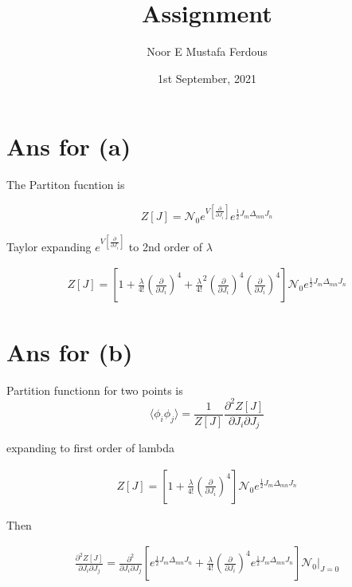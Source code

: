 \documentclass[12pt, letterpaper]{article}
\author{Noor E Mustafa Ferdous}
\title{Assignment}
\date{1st September, 2021}
\newcommand*{\1}{\hspace{1pt}}
\begin{document}
    \maketitle
    
    \section*{Ans for (a)}

    The Partiton fucntion is 

    \begin{equation}
        Z[J] = \mathcal{N}_{0} e^{V[\frac{\partial}{\partial J_{i}}]} e^{\frac{1}{2} J_{m} \Delta _{mn} J_{n}}
    \end{equation}

    Taylor expanding  $e^{V[{\frac{\partial}{\partial J_{i}}}]}$ to 2nd order of $\lambda$ 

    \begin{equation}
    \begin{split}
        Z[J] = [1 + \frac{\lambda}{4!}(\frac{\partial}{\partial J_{i}})^{4} + {\frac{\lambda}{4!}}^{2}(\frac{\partial}{\partial J_{i}})^{4}(\frac{\partial}{\partial J_{i}})^{4}] \mathcal{N}_{0} e^{\frac{1}{2} J_{m} \Delta _{mn} J_{n}}
    \end{split}
    \end{equation}

    \newpage

    \section*{Ans for (b)}

    Partition functionn for two points is
    \begin{equation}
        \langle \phi_{i} \phi_{j} \rangle = \frac{1}{Z[J]} \frac{\partial ^{2} Z[J]}{{\partial J_{i} \partial J_{j}}} 
    \end{equation}

    expanding to first order of lambda

    \begin{equation}
    \begin{split}
        Z[J] = [1 + \frac{\lambda}{4!}(\frac{\partial}{\partial J_{i}})^{4} ] \mathcal{N}_{0} e^{\frac{1}{2} J_{m} \Delta _{mn} J_{n}}
    \end{split}
    \end{equation}

    Then

    \begin{equation}
    \begin{split}
        \frac{\partial ^{2} Z[J]}{\partial J_{i} \partial J_{j}} =\frac{\partial ^{2}}{\partial J_{i} \partial J_{j}} [e^{\frac{1}{2} J_{m} \Delta _{mn} J_{n}} + \frac{\lambda}{4!}(\frac{\partial}{\partial J_{i}})^{4} e^{\frac{1}{2} J_{m} \Delta _{mn} J_{n}} ] \mathcal{N}_{0} \Biggr|_{J=0}
    \end{split}
    \end{equation}
\end{document}
